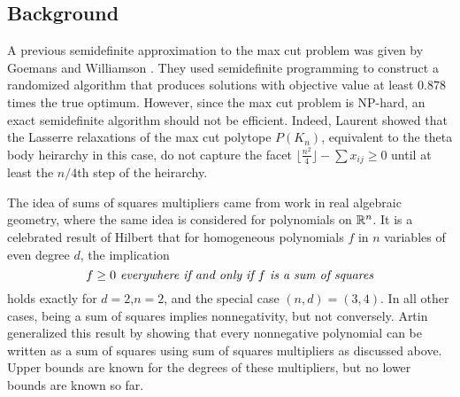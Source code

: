 \subsection{Background}
A previous semidefinite approximation to the max cut problem was given by Goemans and Williamson \cite{goemans_williamson}.
They used semidefinite programming to construct a randomized algorithm that produces solutions with objective value at least $0.878$ times the true optimum.
However, since the max cut problem is NP-hard, an exact semidefinite algorithm should not be efficient.
Indeed, Laurent \cite{moniquestuff} showed that the Lasserre relaxations of the max cut polytope $P(K_n)$, equivalent to the theta body heirarchy in this case, do not capture the facet $\lfloor \frac{n^2}{4} \rfloor - \sum x_{ij} \ge 0$ until at least the $n/4$th step of the heirarchy.

The idea of sums of squares multipliers came from work in real algebraic geometry, where the same idea is considered for polynomials on $\mathbb{R}^n$.
It is a celebrated result of Hilbert \cite{hilbert} that for homogeneous polynomials $f$ in $n$ variables of even degree $d$, the implication
$$\hbox{\em $f \ge 0$ everywhere if and only if $f$ is a sum of squares}$$
holds exactly for $d=2$,$n=2$, and the special case $(n,d)=(3,4)$.
In all other cases, being a sum of squares implies nonnegativity, but not conversely.
Artin \cite{artin} generalized this result by showing that every nonnegative polynomial can be written as a sum of squares using sum of squares multipliers as discussed above.
Upper bounds are known for the degrees of these multipliers, but no lower bounds are known so far. %

